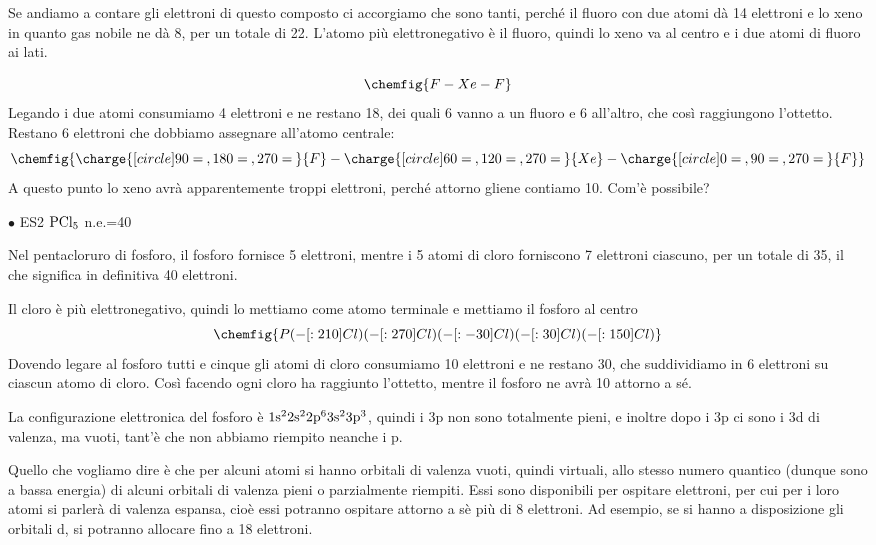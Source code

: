 Se andiamo a contare gli elettroni di questo composto ci accorgiamo che sono tanti, perché il fluoro con due atomi dà 14 elettroni e lo xeno in quanto gas nobile ne dà 8, per un totale di 22. L'atomo più elettronegativo è il fluoro, quindi lo xeno va al centro e i due atomi di fluoro ai lati. 
 
$$
\chemfig{F-Xe-F}
$$
Legando i due atomi consumiamo 4 elettroni e ne restano 18, dei quali 6 vanno a un fluoro e 6 all'altro, che così raggiungono l'ottetto. Restano 6 elettroni che dobbiamo assegnare all'atomo centrale:
$$
\chemfig{\charge{[circle]90=\:,180=\:,270=\:}{F}-\charge{[circle]60=\:,120=\:,270=\:}{Xe}-\charge{[circle]0=\:,90=\:,270=\:}{F}}
$$
A questo punto lo xeno avrà apparentemente troppi elettroni, perché attorno gliene contiamo 10. Com'è possibile?

\vspace{0.2cm}$\bullet$ ES2 $\rm PCl_5$ n.e.=40
    
Nel pentacloruro di fosforo, il fosforo fornisce 5 elettroni, mentre i 5 atomi di cloro forniscono 7 elettroni ciascuno, per un totale di 35, il che significa in definitiva 40 elettroni.

Il cloro è più elettronegativo, quindi lo mettiamo come atomo terminale e mettiamo il fosforo al centro
$$
\chemfig{P(-[:210]Cl)(-[:270]Cl)(-[:-30]Cl)(-[:30]Cl)(-[:150]Cl)}
$$
Dovendo legare al fosforo tutti e cinque gli atomi di cloro consumiamo 10 elettroni e ne restano 30, che suddividiamo in 6 elettroni su ciascun atomo di cloro. Così facendo ogni cloro ha raggiunto l'ottetto, mentre il fosforo ne avrà 10 attorno a sé.
    
La configurazione elettronica del fosforo è $\rm 1s^22s^22p^63s^23p^3$, quindi i 3p non sono totalmente pieni, e inoltre dopo i 3p ci sono i 3d di valenza, ma vuoti, tant'è che non abbiamo riempito neanche i p.

Quello che vogliamo dire è che per alcuni atomi si hanno orbitali di valenza vuoti, quindi virtuali, allo stesso numero quantico (dunque sono a bassa energia) di alcuni orbitali di valenza pieni o parzialmente riempiti. Essi sono disponibili per ospitare elettroni, per cui per i loro atomi si parlerà di valenza espansa, cioè essi potranno ospitare attorno a sè più di 8 elettroni. Ad esempio, se si hanno a disposizione gli orbitali d, si potranno allocare fino a 18 elettroni.
